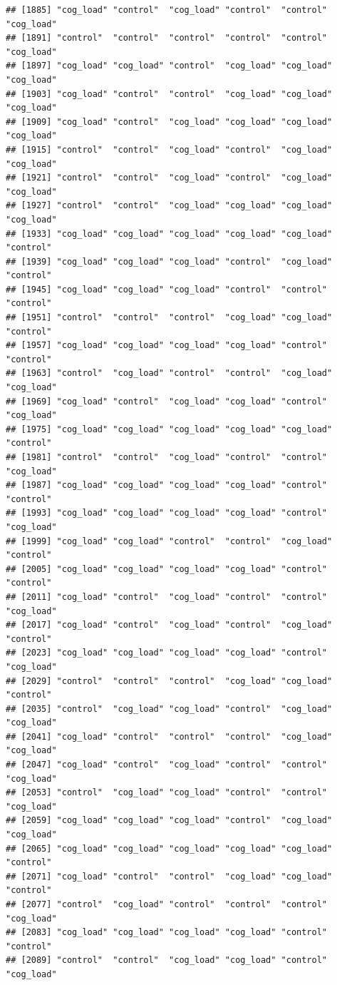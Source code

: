 \documentclass[
  american,
  man,floatsintext]{apa7}
\begin{document}
\begin{verbatim}
## [1885] "cog_load" "control"  "cog_load" "control"  "control"  "cog_load"
## [1891] "control"  "control"  "control"  "control"  "control"  "cog_load"
## [1897] "cog_load" "cog_load" "control"  "cog_load" "cog_load" "cog_load"
## [1903] "cog_load" "control"  "control"  "cog_load" "cog_load" "cog_load"
## [1909] "cog_load" "control"  "cog_load" "cog_load" "cog_load" "cog_load"
## [1915] "control"  "control"  "cog_load" "control"  "cog_load" "cog_load"
## [1921] "control"  "control"  "cog_load" "control"  "cog_load" "cog_load"
## [1927] "control"  "control"  "cog_load" "cog_load" "cog_load" "cog_load"
## [1933] "cog_load" "cog_load" "cog_load" "cog_load" "cog_load" "control" 
## [1939] "cog_load" "cog_load" "cog_load" "control"  "cog_load" "control" 
## [1945] "cog_load" "cog_load" "cog_load" "control"  "control"  "control" 
## [1951] "control"  "control"  "control"  "cog_load" "cog_load" "control" 
## [1957] "cog_load" "cog_load" "cog_load" "cog_load" "control"  "control" 
## [1963] "control"  "cog_load" "control"  "control"  "cog_load" "cog_load"
## [1969] "cog_load" "control"  "cog_load" "cog_load" "control"  "cog_load"
## [1975] "cog_load" "cog_load" "cog_load" "cog_load" "cog_load" "control" 
## [1981] "control"  "control"  "cog_load" "control"  "control"  "cog_load"
## [1987] "cog_load" "cog_load" "cog_load" "cog_load" "control"  "control" 
## [1993] "cog_load" "cog_load" "cog_load" "cog_load" "control"  "cog_load"
## [1999] "cog_load" "cog_load" "control"  "control"  "cog_load" "control" 
## [2005] "cog_load" "cog_load" "cog_load" "cog_load" "control"  "control" 
## [2011] "cog_load" "control"  "cog_load" "control"  "control"  "cog_load"
## [2017] "cog_load" "control"  "cog_load" "control"  "cog_load" "control" 
## [2023] "cog_load" "cog_load" "cog_load" "cog_load" "control"  "cog_load"
## [2029] "control"  "control"  "control"  "cog_load" "cog_load" "control" 
## [2035] "control"  "cog_load" "cog_load" "control"  "cog_load" "cog_load"
## [2041] "cog_load" "control"  "control"  "control"  "cog_load" "cog_load"
## [2047] "cog_load" "control"  "cog_load" "control"  "control"  "cog_load"
## [2053] "control"  "cog_load" "cog_load" "control"  "control"  "cog_load"
## [2059] "cog_load" "cog_load" "cog_load" "control"  "cog_load" "cog_load"
## [2065] "cog_load" "cog_load" "cog_load" "cog_load" "cog_load" "control" 
## [2071] "cog_load" "control"  "control"  "cog_load" "cog_load" "control" 
## [2077] "control"  "cog_load" "control"  "control"  "control"  "cog_load"
## [2083] "cog_load" "cog_load" "cog_load" "cog_load" "control"  "control" 
## [2089] "control"  "control"  "cog_load" "cog_load" "control"  "cog_load"

\end{verbatim}
\end{document}
